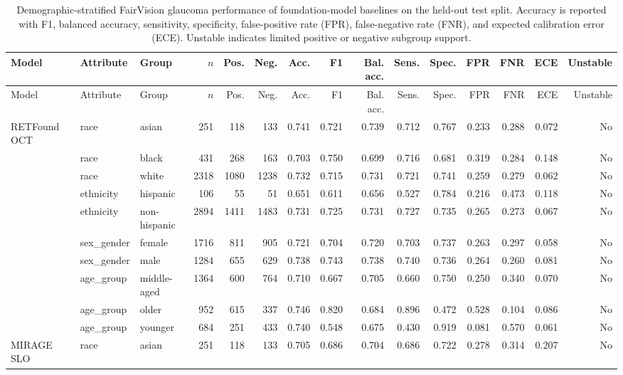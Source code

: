 \begingroup
\scriptsize
\setlength{\tabcolsep}{3pt}
\begin{longtable}{@{}lllrrrrrrrrrrrr@{}}
\caption{Demographic-stratified FairVision glaucoma performance of foundation-model baselines on the held-out test split. Accuracy is reported with F1, balanced accuracy, sensitivity, specificity, false-positive rate (FPR), false-negative rate (FNR), and expected calibration error (ECE). Unstable indicates limited positive or negative subgroup support.}\label{tab:fairvision_foundation_demographic_glaucoma}\\
\toprule
Model & Attribute & Group & $n$ & Pos. & Neg. & Acc. & F1 & Bal. acc. & Sens. & Spec. & FPR & FNR & ECE & Unstable \\
\midrule
\endfirsthead
\toprule
Model & Attribute & Group & $n$ & Pos. & Neg. & Acc. & F1 & Bal. acc. & Sens. & Spec. & FPR & FNR & ECE & Unstable \\
\midrule
\endhead
RETFound OCT & race & asian & 251 & 118 & 133 & 0.741 & 0.721 & 0.739 & 0.712 & 0.767 & 0.233 & 0.288 & 0.072 & No \\
 & race & black & 431 & 268 & 163 & 0.703 & 0.750 & 0.699 & 0.716 & 0.681 & 0.319 & 0.284 & 0.148 & No \\
 & race & white & 2318 & 1080 & 1238 & 0.732 & 0.715 & 0.731 & 0.721 & 0.741 & 0.259 & 0.279 & 0.062 & No \\
 & ethnicity & hispanic & 106 & 55 & 51 & 0.651 & 0.611 & 0.656 & 0.527 & 0.784 & 0.216 & 0.473 & 0.118 & No \\
 & ethnicity & non-hispanic & 2894 & 1411 & 1483 & 0.731 & 0.725 & 0.731 & 0.727 & 0.735 & 0.265 & 0.273 & 0.067 & No \\
 & sex\_gender & female & 1716 & 811 & 905 & 0.721 & 0.704 & 0.720 & 0.703 & 0.737 & 0.263 & 0.297 & 0.058 & No \\
 & sex\_gender & male & 1284 & 655 & 629 & 0.738 & 0.743 & 0.738 & 0.740 & 0.736 & 0.264 & 0.260 & 0.081 & No \\
 & age\_group & middle-aged & 1364 & 600 & 764 & 0.710 & 0.667 & 0.705 & 0.660 & 0.750 & 0.250 & 0.340 & 0.070 & No \\
 & age\_group & older & 952 & 615 & 337 & 0.746 & 0.820 & 0.684 & 0.896 & 0.472 & 0.528 & 0.104 & 0.086 & No \\
 & age\_group & younger & 684 & 251 & 433 & 0.740 & 0.548 & 0.675 & 0.430 & 0.919 & 0.081 & 0.570 & 0.061 & No \\
MIRAGE SLO & race & asian & 251 & 118 & 133 & 0.705 & 0.686 & 0.704 & 0.686 & 0.722 & 0.278 & 0.314 & 0.207 & No \\

\end{longtable}
